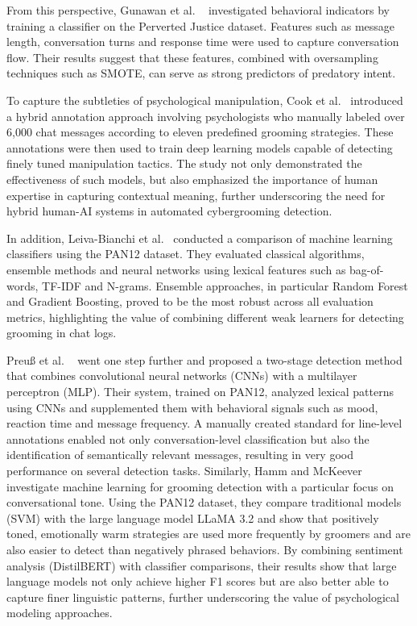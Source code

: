 From this perspective, Gunawan et al. \ \parencite{gunawan2016detecting} investigated behavioral indicators by training a classifier on the Perverted Justice dataset. Features such as message length, conversation turns and response time were used to capture conversation flow. Their results suggest that these features, combined with oversampling techniques such as SMOTE, can serve as strong predictors of predatory intent.

To capture the subtleties of psychological manipulation, Cook et al.\ \parencite{cook2023protecting} introduced a hybrid annotation approach involving psychologists who manually labeled over 6,000 chat messages according to eleven predefined grooming strategies. These annotations were then used to train deep learning models capable of detecting finely tuned manipulation tactics. The study not only demonstrated the effectiveness of such models, but also emphasized the importance of human expertise in capturing contextual meaning, further underscoring the need for hybrid human-AI systems in automated cybergrooming detection.


In addition, Leiva-Bianchi et al.\ \parencite{leiva2024meta} conducted a comparison of machine learning classifiers using the PAN12 dataset. They evaluated classical algorithms, ensemble methods and neural networks using lexical features such as bag-of-words, TF-IDF and N-grams. Ensemble approaches, in particular Random Forest and Gradient Boosting, proved to be the most robust across all evaluation metrics, highlighting the value of combining different weak learners for detecting grooming in chat logs.

Preuß et al. \ \parencite{preuss2021automatically} went one step further and proposed a two-stage detection method that combines convolutional neural networks (CNNs) with a multilayer perceptron (MLP). Their system, trained on PAN12, analyzed lexical patterns using CNNs and supplemented them with behavioral signals such as mood, reaction time and message frequency. A manually created standard for line-level annotations enabled not only conversation-level classification but also the identification of semantically relevant messages, resulting in very good performance on several detection tasks. Similarly, Hamm and McKeever \parencite{hamm2025llms} investigate machine learning for grooming detection with a particular focus on conversational tone. Using the PAN12 dataset, they compare traditional models (SVM) with the large language model LLaMA 3.2 and show that positively toned, emotionally warm strategies are used more frequently by groomers and are also easier to detect than negatively phrased behaviors. By combining sentiment analysis (DistilBERT) with classifier comparisons, their results show that large language models not only achieve higher F1 scores but are also better able to capture finer linguistic patterns, further underscoring the value of psychological modeling approaches.

